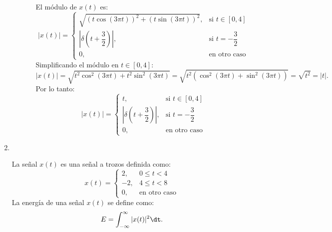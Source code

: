 \begin{enumerate}[label=\color{red}\textbf{\arabic*)}]
\begin{enumerate}[label=Paso \arabic*:]
\begin{enumerate}[label=\textbf{\alph*)}]
                El módulo de $x(t)$ es: \[
                |x(t)|=\begin{cases}
                    \sqrt{(t\cos(3\pi t))^2+(t\sin(3\pi t))^2}, & \text{si }t\in [0,4]\\
                    \left| \delta\left( t+\dfrac{3}{2} \right)  \right| , & \text{si }t=-\dfrac{3}{2}\\
                    0, & \text{en otro caso}
                \end{cases}
                \] 
                Simplificando el módulo en $t\in [0,4]$: \[
                |x(t)|=\sqrt{t^2\cos^2(3\pi t)+t^2\sin^2(3\pi t)}=\sqrt{t^2(\cos^2(3\pi t)+\sin^2(3\pi t))}=\sqrt{t^2}=|t|.   
                \] 
                Por lo tanto: \[
                |x(t)|=\begin{cases}
                    t, & \text{si }t\in [0,4]\\
                    \left| \delta\left( t+\dfrac{3}{2} \right)  \right| , & \text{si }t=-\dfrac{3}{2}\\
                    0, & \text{en otro caso}
                \end{cases}
                \] 
        \end{enumerate}
\end{enumerate}
\item {}
\begin{center}
    \\
\end{center}
La señal $x(t)$ es una señal a trozos definida como: \[
x(t)=\begin{cases}
    2, & 0\le t<4\\
    -2, & 4\le t<8\\
    0, & \text{en otro caso}
\end{cases}
\] 
La energía de una señal $x(t)$ se define como:  \[
E=\int_{-\infty}^{\infty} |x(t)|^2\dt .
\]
\end{enumerate}
